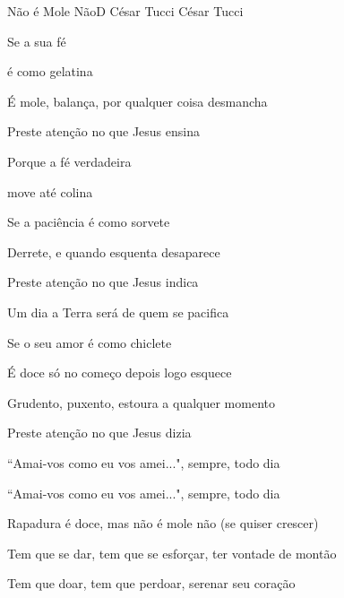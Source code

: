 \documentclass[a4,12pt,oneside]{book}
\newcommand{\RevDate}{\today}
\newcommand{\NotCCLIed}{\relax}
\begin{document}
\begin{song}{Não é Mole Não}{D}
  {César Tucci}
  {César Tucci}
  {}
  {\NotCCLIed}
  
	\renewcommand{\RevDate}{28 de abril de 2015}
 
	
	\ifChordBk	
		\vspace{-2em}\flushright{\Dchord \quad \Bmchord \quad \Achord \quad \Gschord}
		\vspace{-1ex}
	\fi
	
	\begin{SBVerse*}
		Se a sua fé
		
		é como gelatina
		
		É mole, balança, por qualquer coisa desmancha

		Preste atenção no que Jesus ensina
		
		Porque a fé verdadeira
		
		move até colina
	\end{SBVerse*}

	\begin{SBVerse*}
		Se a paciência é como sorvete
		
		Derrete, e quando esquenta desaparece
		
		Preste atenção no que Jesus indica
		
		Um dia a Terra será de quem se pacifica
	\end{SBVerse*}

	\begin{SBVerse*}
		Se o seu amor é como chiclete
		
		É doce só no começo depois logo esquece
		
		Grudento, puxento, estoura a qualquer momento
		
		Preste atenção no que Jesus dizia
		
		“Amai-vos como eu vos amei...", sempre, todo dia
		
		“Amai-vos como eu vos amei...", sempre, todo dia
	\end{SBVerse*}


	\begin{SBVerse*}
		Rapadura é doce, mas não é mole não (se quiser crescer)
		 
		Tem que se dar, tem que se esforçar, ter vontade de montão
		
		Tem que doar, tem que perdoar, serenar seu coração		
	\end{SBVerse*}
\end{song}
\end{document}

